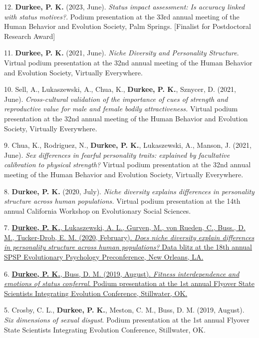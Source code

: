 \documentclass[10pt,]{article}
\begin{document}
12. \hangindent=0.5in \textbf{Durkee, P. K.} (2023, June). \emph{Status
impact assessment: Is accuracy linked with status motives?}. Podium
presentation at the 33rd annual meeting of the Human Behavior and
Evolution Society, Palm Springs. {[}Finalist for Postdoctoral Research
Award{]}

11. \hangindent=0.5in \textbf{Durkee, P. K.} (2021, June). \emph{Niche
Diversity and Personality Structure}. Virtual podium presentation at the
32nd annual meeting of the Human Behavior and Evolution Society,
Virtually Everywhere.

10. \hangindent=0.5in Sell, A., Lukaszewski, A., Chua, K.,
\textbf{Durkee, P. K.}, Sznycer, D. (2021, June). \emph{Cross-cultural
validation of the importance of cues of strength and reproductive value
for male and female bodily attractiveness.} Virtual podium presentation
at the 32nd annual meeting of the Human Behavior and Evolution Society,
Virtually Everywhere.

9. \hangindent=0.5in Chua, K., Rodriguez, N., \textbf{Durkee, P. K.},
Lukaszewski, A., Manson, J. (2021, June). \emph{Sex differences in
fearful personality traits: explained by facultative calibration to
physical strength?} Virtual podium presentation at the 32nd annual
meeting of the Human Behavior and Evolution Society, Virtually
Everywhere.

8. \hangindent=0.5in \textbf{Durkee, P. K.} (2020, July). \emph{Niche
diversity explains differences in personality structure across human
populations.} Virtual podium presentation at the 14th annual California
Workshop on Evolutionary Social Sciences.

7. \hangindent=0.5in \href{https://osf.io/6gp85/}{\textbf{Durkee, P.
K.}, Lukaszewski, A. L., Gurven, M., von Rueden, C., Buss., D. M.,
Tucker-Drob, E. M. (2020, February). \emph{Does niche diversity explain
differences in personality structure across human populations?} Data
blitz at the 18th annual SPSP Evolutionary Psychology Preconference, New
Orleans, LA.\textsuperscript{\faFilePdfO}}

6. \hangindent=0.5in \href{https://osf.io/6enb8/}{\textbf{Durkee, P.
K.}, Buss, D. M. (2019, August). \emph{Fitness interdependence and
emotions of status conferral}. Podium presentation at the 1st annual
Flyover State Scientists Integrating Evolution Conference, Stillwater,
OK.\textsuperscript{\faFilePdfO}}

5. \hangindent=0.5in Crosby, C. L., \textbf{Durkee, P. K.}, Meston, C.
M., Buss, D. M. (2019, August). \emph{Six dimensions of sexual disgust}.
Podium presentation at the 1st annual Flyover State Scientists
Integrating Evolution Conference, Stillwater, OK.
\end{document}
